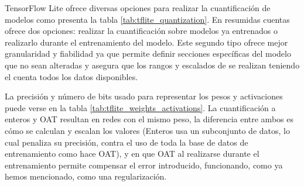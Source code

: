 TensorFlow Lite ofrece diversas opciones para realizar la cuantificación de modelos como presenta la tabla \ref{tab:tflite_quantization}. En resumidas cuentas ofrece dos opciones: realizar la cuantificación sobre modelos ya entrenados o realizarlo durante el entrenamiento del modelo. Este segundo tipo ofrece mejor granularidad y fiabilidad ya que permite definir secciones específicas del modelo que no sean alteradas y asegura que los rangos y escalados de se realizan teniendo el cuenta todos los datos disponibles. 



La precisión y número de bits usado para representar los pesos y activaciones puede verse en la tabla \ref{tab:tflite_weights_activations}. La cuantificación a enteros y OAT resultan en redes con el mismo peso, la diferencia entre ambos es cómo se calculan y escalan los valores (Enteros usa un subconjunto de datos, lo cual penaliza su precisión, contra el uso de toda la base de datos de entrenamiento como hace OAT), y en que OAT al realizarse durante el entrenamiento permite compensar el error introducido, funcionando, como ya hemos mencionado, como una regularización.


